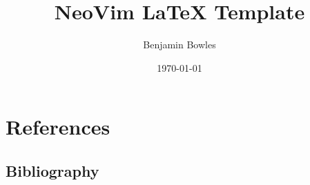 \documentclass[10pt]{article}
\title{NeoVim LaTeX Template}
\author{Benjamin Bowles}
\date{\today}
\begin{document}
\maketitle
\newpage

\tableofcontents
\newpage

\section{References}
\cite{TestBook}


\subsection{Bibliography}



\newpage
\end{document}
